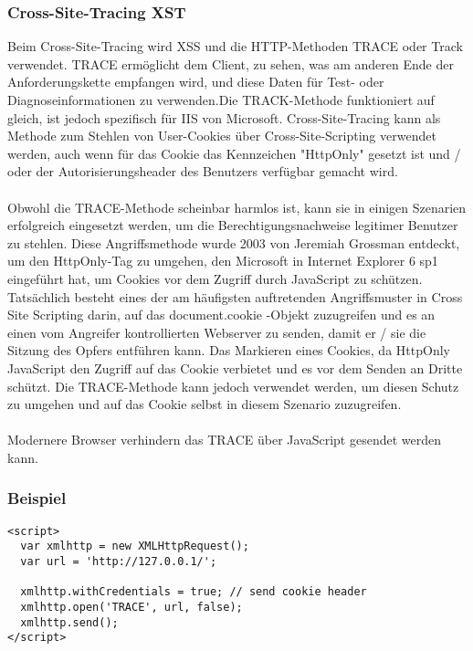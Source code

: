 {\subsubsection{Cross-Site-Tracing XST}
Beim Cross-Site-Tracing wird XSS und die HTTP-Methoden TRACE oder Track verwendet. TRACE ermöglicht dem Client, zu sehen, was am anderen Ende der Anforderungskette empfangen wird, und diese Daten für Test- oder Diagnoseinformationen zu verwenden.Die TRACK-Methode funktioniert auf gleich, ist jedoch spezifisch für IIS von Microsoft. Cross-Site-Tracing kann als Methode zum Stehlen von User-Cookies über Cross-Site-Scripting verwendet werden, auch wenn für das Cookie das Kennzeichen "HttpOnly" gesetzt ist und / oder der Autorisierungsheader des Benutzers verfügbar gemacht wird.
\\ \\
Obwohl die TRACE-Methode scheinbar harmlos ist, kann sie in einigen Szenarien erfolgreich eingesetzt werden, um die Berechtigungsnachweise legitimer Benutzer zu stehlen. Diese Angriffsmethode wurde 2003 von Jeremiah Grossman entdeckt, um den HttpOnly-Tag zu umgehen, den Microsoft in Internet Explorer 6 sp1 eingeführt hat, um Cookies vor dem Zugriff durch JavaScript zu schützen. Tatsächlich besteht eines der am häufigsten auftretenden Angriffsmuster in Cross Site Scripting darin, auf das document.cookie -Objekt zuzugreifen und es an einen vom Angreifer kontrollierten Webserver zu senden, damit er / sie die Sitzung des Opfers entführen kann. Das Markieren eines Cookies, da HttpOnly JavaScript den Zugriff auf das Cookie verbietet und es vor dem Senden an Dritte schützt. Die TRACE-Methode kann jedoch verwendet werden, um diesen Schutz zu umgehen und auf das Cookie selbst in diesem Szenario zuzugreifen.
\\ \\
Modernere Browser verhindern das TRACE über JavaScript gesendet werden kann.
\subsubsection{Beispiel}
\begin{lstlisting}
<script>
  var xmlhttp = new XMLHttpRequest();
  var url = 'http://127.0.0.1/';

  xmlhttp.withCredentials = true; // send cookie header
  xmlhttp.open('TRACE', url, false);
  xmlhttp.send();
</script>
\end{lstlisting}
}
